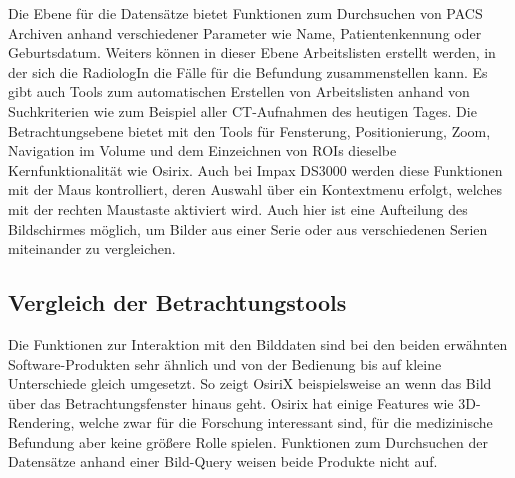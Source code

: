%
Die Ebene für die Datensätze bietet Funktionen zum Durchsuchen von PACS Archiven anhand verschiedener Parameter wie Name, Patientenkennung oder Geburtsdatum.
Weiters können in dieser Ebene Arbeitslisten erstellt werden, in der sich die RadiologIn die Fälle für die Befundung zusammenstellen kann.
Es gibt auch Tools zum automatischen Erstellen von Arbeitslisten anhand von Suchkriterien wie zum Beispiel aller CT-Aufnahmen des heutigen Tages.
%
Die Betrachtungsebene bietet mit den Tools für Fensterung, Positionierung, Zoom, Navigation im Volume und dem Einzeichnen von ROIs dieselbe Kernfunktionalität wie Osirix.
Auch bei Impax DS3000 werden diese Funktionen mit der Maus kontrolliert, deren Auswahl über ein Kontextmenu erfolgt, welches mit der rechten Maustaste aktiviert wird.
Auch hier ist eine Aufteilung des Bildschirmes möglich, 
um Bilder aus einer Serie oder aus verschiedenen Serien miteinander zu vergleichen.


\subsection{Vergleich der Betrachtungstools}
\label{sec:Vergleich der Betrachtungstools}
Die Funktionen zur Interaktion mit den Bilddaten sind bei den beiden erwähnten Software-Produkten sehr ähnlich und von der Bedienung bis auf kleine Unterschiede gleich umgesetzt.
So zeigt OsiriX beispielsweise an wenn das Bild über das Betrachtungsfenster hinaus geht.
Osirix hat einige Features wie 3D-Rendering, welche zwar für die Forschung interessant sind, für die medizinische Befundung aber keine größere Rolle spielen.
Funktionen zum Durchsuchen der Datensätze anhand einer Bild-Query weisen beide Produkte nicht auf.



